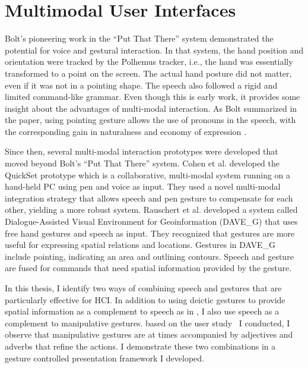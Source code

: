 \section{Multimodal User Interfaces}
Bolt's pioneering work in the ``Put That There'' system \cite{Bolt80} 
demonstrated the potential for voice and gestural interaction.  In that system, 
the hand position and orientation were tracked by the Polhemus tracker, i.e.,
the hand was essentially transformed to a point on the screen. The actual hand 
posture did not matter, even if it was not in a pointing shape. The speech also 
followed a rigid and limited command-like grammar. Even though this is early 
work, it provides some insight about the advantages of multi-modal interaction. 
As Bolt summarized in the paper, using pointing gesture allows the use of 
pronouns in the speech, with the corresponding gain in naturalness and economy 
of expression \cite{Bolt80}.

Since then, several multi-modal interaction prototypes were 
developed that moved beyond Bolt's ``Put That There'' system. Cohen et al. 
\cite{Cohen97} developed the QuickSet prototype which is a collaborative, 
multi-modal system running on a hand-held PC using pen and voice as input. They 
used a novel multi-modal integration strategy that allows speech and pen gesture 
to compensate for each other, yielding a more robust system. Rauschert et al. 
\cite{Rauschert02} developed a system called Dialogue-Assisted Visual 
Environment for Geoinformation (DAVE\_G) that uses free hand gestures and speech
as input. They recognized that gestures are more useful for expressing spatial 
relations and locations. Gestures in DAVE\_G include pointing, indicating an 
area and outlining contours. Speech and gesture are fused for commands that need
spatial information provided by the gesture. 

In this thesis, I identify two ways of combining speech and gestures that are
particularly effective for HCI.
In addition to using deictic gestures to provide spatial information as a
complement to speech as in \cite{Rauschert02}, I also use speech as a
complement to manipulative gestures.
based on the user study~\cite{yin10} I
conducted, I observe that manipulative gestures are at times accompanied by
adjectives and adverbs that refine the actions. I demonstrate these two
combinations in a gesture controlled presentation framework I developed.
